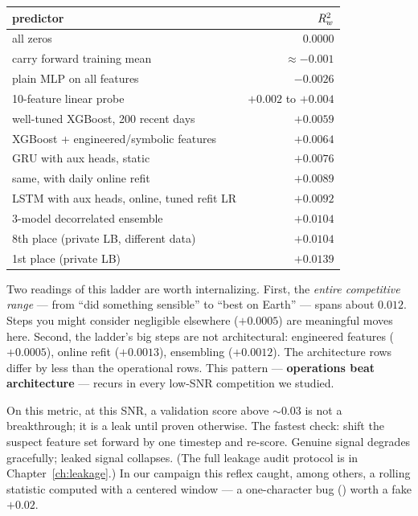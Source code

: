\begin{center}
\begin{tabular}{@{}lr@{}}
\toprule
predictor & $R^2_{w}$ \\
\midrule
all zeros & $0.0000$ \\
carry forward training mean & $\approx -0.001$ \\
plain MLP on all features & $-0.0026$ \\
10-feature linear probe & $+0.002$ to $+0.004$ \\
well-tuned XGBoost, 200 recent days & $+0.0059$ \\
XGBoost + engineered/symbolic features & $+0.0064$ \\
GRU with aux heads, static & $+0.0076$ \\
same, with daily online refit & $+0.0089$ \\
LSTM with aux heads, online, tuned refit LR & $+0.0092$ \\
3-model decorrelated ensemble & $+0.0104$ \\
8th place (private LB, different data) & $+0.0104$ \\
1st place (private LB) & $+0.0139$ \\
\bottomrule
\end{tabular}
\end{center}

Two readings of this ladder are worth internalizing. First, the \emph{entire
competitive range} --- from ``did something sensible'' to ``best on Earth''
--- spans about $0.012$. Steps you might consider negligible elsewhere
($+0.0005$) are meaningful moves here. Second, the ladder's big steps are
not architectural: engineered features ($+0.0005$), online refit
($+0.0013$), ensembling ($+0.0012$). The architecture rows differ by less
than the operational rows. This pattern --- \textbf{operations beat
architecture} --- recurs in every low-SNR competition we studied.

\begin{warnbox}
On this metric, at this SNR, a validation score above $\sim 0.03$ is not a
breakthrough; it is a leak until proven otherwise. The fastest check:
shift the suspect feature set forward by one timestep and re-score. Genuine
signal degrades gracefully; leaked signal collapses. (The full leakage
audit protocol is in Chapter~\ref{ch:leakage}.) In our campaign this reflex
caught, among others, a rolling statistic computed with a centered window ---
a one-character bug () worth a fake $+0.02$.
\end{warnbox}

